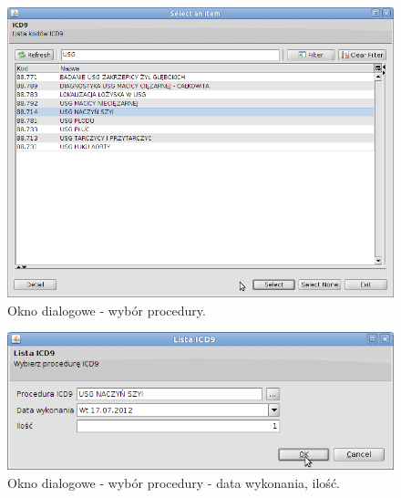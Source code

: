 \begin{figure}%
\centering
\includegraphics[scale=0.4]{images/gruper5}
\caption[Widok grupera]{Okno dialogowe - wybór procedury.}
\label{img:gruper5}
\end{figure}

\begin{figure}%
\centering
\includegraphics[scale=0.4]{images/gruper6}
\caption[Widok grupera]{Okno dialogowe - wybór procedury - data wykonania, ilość.}
\label{img:gruper6}
\end{figure}

